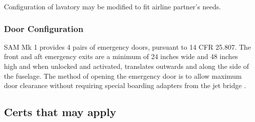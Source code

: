 Configuration of lavatory may be modified to fit airline partner's needs.

\subsubsection{Door Configuration}
SAM Mk 1 provides 4 pairs of emergency doors, pursuant to 14 CFR 25.807.  The front and aft emergency exits are a minimum of 24 inches wide and 48 inches high and when unlocked and activated, translates outwards and along the side of the fuselage.  The method of opening the emergency door is to allow maximum door clearance without requiring special boarding adapters from the jet bridge \cite{cfr}.



\subsection{Certs that may apply}






